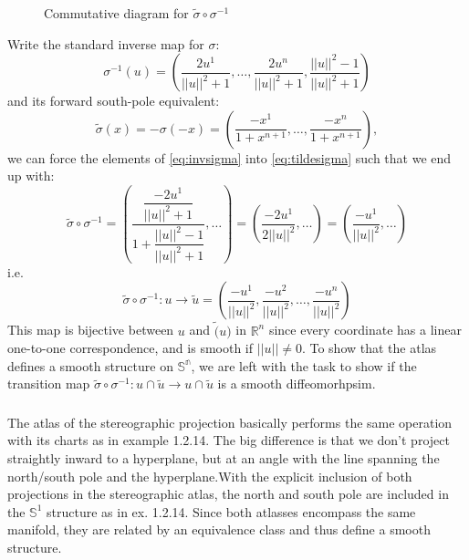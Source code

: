 \begin{figure}[!ht]
	\centering
\caption{Commutative diagram for $\tilde{\sigma}\circ\sigma^{-1}$}
\label{tikz:composite}   
\end{figure}
Write the standard inverse map for $\sigma$:
\begin{equation}
	\label{eq:invsigma}
\sigma^{-1}(u) = \left(\dfrac{2u^1}{||u||^2 + 1}, \dots ,\dfrac{2u^n}{||u||^2 + 1}, \dfrac{||u||^2-1}{||u||^2+1} \right)
\end{equation}
and its forward south-pole equivalent:
\begin{equation}
	\label{eq:tildesigma}
	\tilde{\sigma}(x) = -\sigma(-x) = \left(\dfrac{-x^1}{1+x^{n+1}}, \dots , \dfrac{-x^n}{1+x^{n+1}}\right),
\end{equation}
we can force the elements of \eqref{eq:invsigma} into \eqref{eq:tildesigma} such that we end up with:
\[
\tilde{\sigma}\circ\sigma^{-1} = \left(\dfrac{\dfrac{-2u^1}{||u||^2 + 1}}{1 + \dfrac{||u||^2 - 1}{||u||^2 + 1}}, \dots \right) = \left(\dfrac{-2u^1}{2||u||^2}, \dots \right) = \left( \dfrac{-u^1}{||u||^2}, \dots \right)
\]
i.e. 
\[
	\tilde{\sigma}\circ\sigma^{-1} : u \rightarrow \tilde{u} = \left( \dfrac{-u^1}{||u||^2} ,\dfrac{-u^2}{||u||^2}, \dots, \dfrac{-u^n}{||u||^2} \right)
\]
This map is bijective between $u$ and $\tilde(u)$ in $\mathbb{R}^n$ since every coordinate has a linear one-to-one correspondence, and is smooth if $||u|| \neq 0$.
To show that the atlas defines a smooth structure on $\mathbb{S^n}$,  we are left with the task to show if the transition map 	$\tilde{\sigma}\circ\sigma^{-1} : u \cap \tilde{u} \rightarrow u \cap \tilde{u}$ is a smooth diffeomorhpsim.

\subsubsection{} 
The atlas of the stereographic projection basically performs the same operation with its charts as in example 1.2.14. The big difference is that we don't project straightly inward to a hyperplane, but at an angle with the line spanning the north/south pole and the hyperplane.With the explicit inclusion of both projections in the stereographic atlas, the north and south pole are included in the $\mathbb{S}^1$ structure as in ex. 1.2.14. Since both atlasses encompass the same manifold, they are related by an equivalence class and thus define a smooth structure.